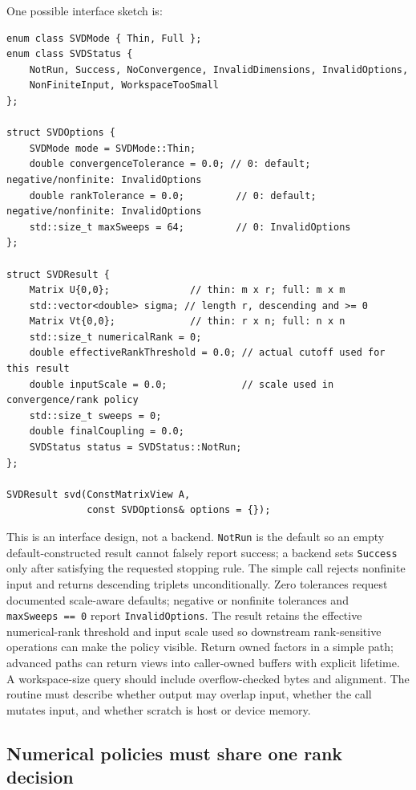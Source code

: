 One possible interface sketch is:

\begin{verbatim}
enum class SVDMode { Thin, Full };
enum class SVDStatus {
    NotRun, Success, NoConvergence, InvalidDimensions, InvalidOptions,
    NonFiniteInput, WorkspaceTooSmall
};

struct SVDOptions {
    SVDMode mode = SVDMode::Thin;
    double convergenceTolerance = 0.0; // 0: default; negative/nonfinite: InvalidOptions
    double rankTolerance = 0.0;         // 0: default; negative/nonfinite: InvalidOptions
    std::size_t maxSweeps = 64;         // 0: InvalidOptions
};

struct SVDResult {
    Matrix U{0,0};              // thin: m x r; full: m x m
    std::vector<double> sigma; // length r, descending and >= 0
    Matrix Vt{0,0};             // thin: r x n; full: n x n
    std::size_t numericalRank = 0;
    double effectiveRankThreshold = 0.0; // actual cutoff used for this result
    double inputScale = 0.0;             // scale used in convergence/rank policy
    std::size_t sweeps = 0;
    double finalCoupling = 0.0;
    SVDStatus status = SVDStatus::NotRun;
};

SVDResult svd(ConstMatrixView A,
              const SVDOptions& options = {});
\end{verbatim}

This is an interface design, not a backend. \texttt{NotRun} is the default so an empty default-constructed result cannot falsely report success; a backend sets \texttt{Success} only after satisfying the requested stopping rule. The simple call rejects nonfinite input and returns descending triplets unconditionally. Zero tolerances request documented scale-aware defaults; negative or nonfinite tolerances and \texttt{maxSweeps\ ==\ 0} report \texttt{InvalidOptions}. The result retains the effective numerical-rank threshold and input scale used so downstream rank-sensitive operations can make the policy visible. Return owned factors in a simple path; advanced paths can return views into caller-owned buffers with explicit lifetime. A workspace-size query should include overflow-checked bytes and alignment. The routine must describe whether output may overlap input, whether the call mutates input, and whether scratch is host or device memory.

\subsection{Numerical policies must share one rank decision}\label{numerical-policies-must-share-one-rank-decision}

